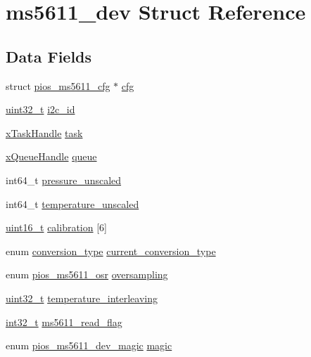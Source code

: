 \hypertarget{structms5611__dev}{\section{ms5611\-\_\-dev Struct Reference}
\label{structms5611__dev}
}
\subsection*{Data Fields}
\begin{DoxyCompactItemize}
\item 
struct \hyperlink{structpios__ms5611__cfg}{pios\-\_\-ms5611\-\_\-cfg} $\ast$ \hyperlink{structms5611__dev_a574b60b9bc78dd7806922d127ef46f02}{cfg}
\item 
\hyperlink{stdint_8h_a435d1572bf3f880d55459d9805097f62}{uint32\-\_\-t} \hyperlink{structms5611__dev_a6a0abf07d8e11d823c152aed1a7cbf76}{i2c\-\_\-id}
\item 
\hyperlink{_common_2_libraries_2_free_r_t_o_s_2_source_2include_2task_8h_a271ae40d5db07d928a113766505a0965}{x\-Task\-Handle} \hyperlink{structms5611__dev_a1c3007a7e12067eb6c4b2e42d0991f69}{task}
\item 
\hyperlink{_common_2_libraries_2_free_r_t_o_s_2_source_2include_2queue_8h_a229037f755b756156e34a440ce134b8b}{x\-Queue\-Handle} \hyperlink{structms5611__dev_a72daf619c834a91f065403ba600b79d5}{queue}
\item 
int64\-\_\-t \hyperlink{structms5611__dev_a06bd507d0e8ff5e0cb6ac32bea05061c}{pressure\-\_\-unscaled}
\item 
int64\-\_\-t \hyperlink{structms5611__dev_ae7a92929f9d2649ee5569f6f7b3227ed}{temperature\-\_\-unscaled}
\item 
\hyperlink{stdint_8h_a273cf69d639a59973b6019625df33e30}{uint16\-\_\-t} \hyperlink{structms5611__dev_a70397164fa20e861a6d63d2662398656}{calibration} \mbox{[}6\mbox{]}
\item 
enum \hyperlink{group___p_i_o_s___m_s5611_ga519b74aaa0203f0671cd8223b8db250a}{conversion\-\_\-type} \hyperlink{structms5611__dev_aa8a4e5f38a07817e999f55e10263a13b}{current\-\_\-conversion\-\_\-type}
\item 
enum \hyperlink{group___p_i_o_s___m_s5611_gab2c6484befa4b5993218d392d4db0bd3}{pios\-\_\-ms5611\-\_\-osr} \hyperlink{structms5611__dev_a0283041db42336e9ebe601eba710bdb3}{oversampling}
\item 
\hyperlink{stdint_8h_a435d1572bf3f880d55459d9805097f62}{uint32\-\_\-t} \hyperlink{structms5611__dev_afc179b4b564d92758f6ae8028f900a0d}{temperature\-\_\-interleaving}
\item 
\hyperlink{group___n_a_m_e_gafd12020da5a235dfcf0c3c748fb5baed}{int32\-\_\-t} \hyperlink{structms5611__dev_a207a039805c1ce6f2751655e7d5f7301}{ms5611\-\_\-read\-\_\-flag}
\item 
enum \hyperlink{group___p_i_o_s___m_s5611_ga3d4540192eb752517e6fc8aff70a97a8}{pios\-\_\-ms5611\-\_\-dev\-\_\-magic} \hyperlink{structms5611__dev_af378d71dd80bc5c444c6a3516036664f}{magic}
\end{DoxyCompactItemize}


